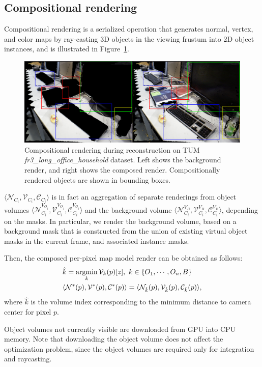 \subsection{Compositional rendering} \label{subsec: rendering}
Compositional rendering is a serialized operation that generates normal, vertex, and color maps by ray-casting 3D objects in the viewing frustum into 2D object instances, and is illustrated in Figure~\ref{fig:compositional_render}.

\begin{figure}[t!]
    \centering
    \includegraphics[width=\linewidth]{figs/compositional-render.pdf}\vspace{-5mm}
    \caption{Compositional rendering during reconstruction on TUM \textit{fr3\_long\_office\_household} dataset. Left shows the background render, and right shows the composed render. Compositionally rendered objects are shown in bounding boxes.}
    \vspace*{-1em}
    \label{fig:compositional_render}
\end{figure}

\(\langle \mathcal{N}_{C_i}, \mathcal{V}_{C_i}, \mathcal{C}_{C_i} \rangle \) is in fact an aggregation of separate renderings from object volumes \(\langle \mathcal{N}_{C_i}^{V_{{O}_j}}, \mathcal{V}_{C_i}^{V_{{O}_j}}, \mathcal{C}_{C_i}^{V_{\mathcal{O}_j}} \rangle \) and the background volume \(\langle \mathcal{N}_{C_i}^{V_{B}}, \mathcal{V}_{C_i}^{V_{B}}, \mathcal{C}_{C_i}^{V_{{B}}}  \rangle \), depending on the masks. In particular, we render the background volume, based on a background mask that is constructed from the union of existing virtual object masks in the current frame, and associated instance masks.

Then, the composed per-pixel map model render can be obtained as follows:
\begin{align}
    &\hat{k} = \operatorname*{\arg\!\min}_k \mathcal{V}_k(p)[z], ~k \in \{O_1, \cdots, O_n, B\} \\
    &\langle \mathcal{N}^*(p), \mathcal{V}^*(p), \mathcal{C}^*(p) \rangle = \langle  \mathcal{N}_{\hat{k}}(p), \mathcal{V}_{\hat{k}}(p), \mathcal{C}_{\hat{k}}(p) \rangle,
\end{align}
where $\hat{k}$ is the volume index corresponding to the minimum distance to camera center for pixel $p$.

Object volumes not currently visible are downloaded from GPU into CPU memory. Note that downloading the object volume does not affect the optimization problem, since the object volumes are required only for integration and raycasting.
